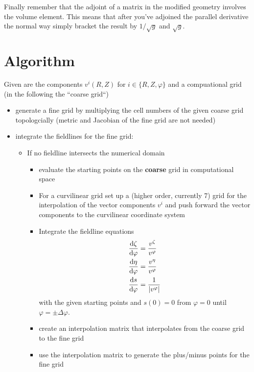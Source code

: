 Finally remember that the adjoint of a matrix in the modified geometry
involves the volume element. This means that after you've adjoined the
parallel derivative the normal way simply bracket the result
by $1/\sqrt{g}$ and $\sqrt{g}$.


\section{Algorithm}
Given are the components $v^i(R,Z)$ for $i\in\{R,Z,\varphi\}$ and a compuational grid (in the following the ``coarse grid``)
\begin{itemize}
  \item generate a fine grid by multiplying the cell numbers of the given coarse grid topologcially (metric and Jacobian of the fine grid are not needed)
  \item integrate the fieldlines for the fine grid:
  \begin{itemize}
  \item If no fieldline intersects the numerical domain
    \begin{itemize}
      \item evaluate the starting points on the \textbf{coarse} grid in computational space
      \item For a curvilinear grid set up a (higher order, currently 7) grid for the
        interpolation of the vector components $v^i$ and push forward the vector components
        to the curvilinear coordinate system
      \item Integrate the fieldline equations 
\begin{subequations}
\begin{align}
\frac{\mathrm{d} \zeta}{\mathrm{d}\varphi} &= \frac{v^\zeta}{v^\varphi}\\
\frac{\mathrm{d} \eta}{\mathrm{d}\varphi} &= \frac{v^\eta}{v^\varphi}\\
\frac{\mathrm{d} s}{\mathrm{d}\varphi} &= \frac{1}{|v^\varphi|}
\end{align}
\label{eq:fieldlines_converted}
\end{subequations}
    with the given starting points and $s(0)=0$ from $\varphi=0$ until $\varphi = \pm\Delta \varphi$.
      \item create an interpolation matrix that interpolates from the coarse grid
        to the fine grid
      \item use the interpolation matrix to generate the plus/minus points for the fine grid
    \end{itemize}

\end{itemize}
\end{itemize}
